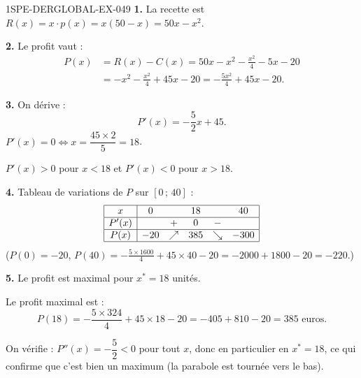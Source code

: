 \begin{corrige}{1SPE-DERGLOBAL-EX-049}
\textbf{1.} La recette est $R(x) = x \cdot p(x) = x(50 - x) = 50x - x^2$.

\textbf{2.} Le profit vaut :
\begin{align*}
P(x) &= R(x) - C(x) = 50x - x^2 - \frac{x^2}{4} - 5x - 20 \\
     &= -x^2 - \frac{x^2}{4} + 45x - 20 = -\frac{5x^2}{4} + 45x - 20.
\end{align*}

\textbf{3.} On dérive :
\[
P'(x) = -\frac{5}{2}x + 45.
\]
$P'(x) = 0 \iff x = \dfrac{45 \times 2}{5} = 18$.

$P'(x) > 0$ pour $x < 18$ et $P'(x) < 0$ pour $x > 18$.

\textbf{4.} Tableau de variations de $P$ sur $\left[0\,;\,40\right]$ :
\[
\begin{array}{|c|ccccc|}
\hline
x     & 0  &  & 18  &  & 40 \\
\hline
P'(x) &    & + & 0  & - & \\
\hline
P(x)  & -20 & \nearrow & 385 & \searrow & -300 \\
\hline
\end{array}
\]
($P(0) = -20$, $P(40) = -\frac{5 \times 1600}{4} + 45 \times 40 - 20 = -2000 + 1800 - 20 = -220$.)

\textbf{5.} Le profit est maximal pour $x^* = \boxed{18}$ unités.

Le profit maximal est :
\[
P(18) = -\frac{5 \times 324}{4} + 45 \times 18 - 20 = -405 + 810 - 20 = \boxed{385 \text{ euros}}.
\]

On vérifie : $P''(x) = -\dfrac{5}{2} < 0$ pour tout $x$, donc en particulier en $x^* = 18$,
ce qui confirme que c'est bien un maximum (la parabole est tournée vers le bas).
\end{corrige}
